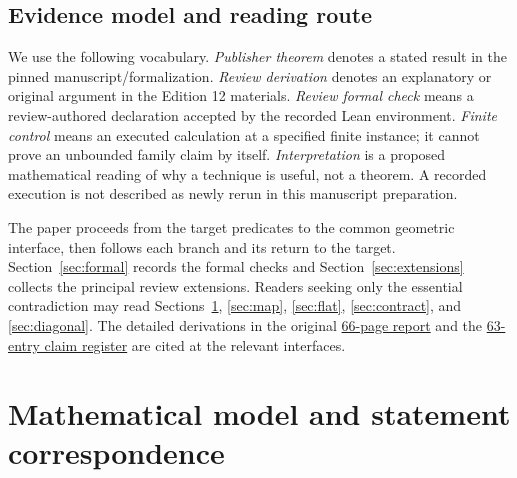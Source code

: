 \documentclass[11pt,letterpaper]{article}
\theoremstyle{definition}\newtheorem{definition}[theorem]{Definition}\newtheorem{example}[theorem]{Example}
\theoremstyle{remark}\newtheorem{remark}[theorem]{Remark}
\newcommand{\aud}[2]{\href{https://github.com/nousentllc/VP-VNP-Review/blob/567303d0bcf4f9d54390437b137752446e58ccd6/#1}{#2}}
\begin{document}
\subsection{Evidence model and reading route}
We use the following vocabulary. \emph{Publisher theorem} denotes a stated result in the pinned manuscript/formalization. \emph{Review derivation} denotes an explanatory or original argument in the Edition 12 materials. \emph{Review formal check} means a review-authored declaration accepted by the recorded Lean environment. \emph{Finite control} means an executed calculation at a specified finite instance; it cannot prove an unbounded family claim by itself. \emph{Interpretation} is a proposed mathematical reading of why a technique is useful, not a theorem. A recorded execution is not described as newly rerun in this manuscript preparation.

The paper proceeds from the target predicates to the common geometric interface, then follows each branch and its return to the target. Section~\ref{sec:formal} records the formal checks and Section~\ref{sec:extensions} collects the principal review extensions. Readers seeking only the essential contradiction may read Sections~\ref{sec:model}, \ref{sec:map}, \ref{sec:flat}, \ref{sec:contract}, and \ref{sec:diagonal}. The detailed derivations in the original \aud{report/VP_VNP_Research_Review.pdf}{66-page report} and the \aud{report/proof-coverage.csv}{63-entry claim register} are cited at the relevant interfaces.

\section{Mathematical model and statement correspondence}\label{sec:model}
\end{document}
